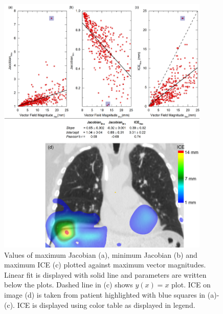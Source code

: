 \documentclass[type=dr, dr=rernat, accentcolor=tud7b,colorbacktitle, bigchapter, openright, twoside, 12pt ]{tudthesis}
\begin{document}

\newpage

\begin{figure}[H]
	\begin{center}		
		\includegraphics[width=0.9\textwidth]{./Images/maxVf_lung.png}
		\caption{Values of maximum Jacobian (a), minimum Jacobian (b) and maximum ICE (c) plotted against maximum vector magnitudes. Linear fit is displayed with solid line and parameters are written below the plots. Dashed line in (c) shows $y(x)= x$ plot. ICE on image (d) is taken from patient highlighted with blue squares in (a)-(c).
			ICE is displayed using color table as displayed in legend.}
		\label{maxvf}
	\end{center}
\end{figure}
\end{document}
